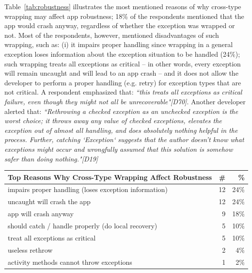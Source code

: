 { Table~\ref{tab:robustness} illustrates the  most mentioned reasons of why cross-type wrapping may affect app robustness; 18\% of the respondents mentioned that the app would crash anyway, regardless of whether the exception was wrapped or not. Most of the respondents, however, mentioned disadvantages of such wrapping, such as: (i) it impairs proper handling since wrapping in a general exception loses information about the exception situation to be handled (24\%); such wrapping treats all exceptions as critical -- in other words, every exception will remain uncaught and will lead to an app crash -- and it does not allow the developer to perform a proper handling (e.g. retry) for exception types that are not critical. A respondent emphasized that: \emph{``this treats all exceptions as critical failure, even though they might not all be unrecoverable"[D70]}. Another developer alerted that: \emph{``Rethrowing a checked exception as an unchecked exception is the worst choice; it throws away any value of checked exceptions, elevates the exception out of almost all handling, and does absolutely nothing helpful in the process. Further, catching `Exception` suggests that the author doesn't know what exceptions might occur and wrongfully assumed that this solution is somehow safer than doing nothing."[D19]}

\bigskip


\begin{table}
\scriptsize
\centering
\begin{tabular}{lrr}
\hline
\bfseries{Top Reasons Why Cross-Type Wrapping Affect Robustness} & \bfseries{\#} & \bfseries{\%} \\
\hline
impairs proper handling (loses exception information)	& 12 &	24\% \\
uncaught will crash the app	& 12 &	24\% \\
app will crash anyway	& 9	& 18\% \\
should catch / handle properly (do local recovery)	 & 5 & 	10\% \\
treat all exceptions as critical	& 5 &	10\% \\
useless rethrow	& 2 &	4\% \\
activity methods cannot throw exceptions &	1 &	2\% \\


\end{tabular}
\end{table}}
